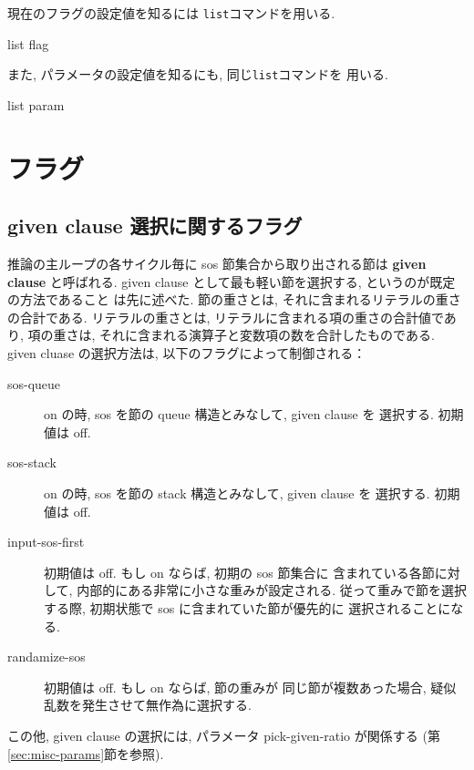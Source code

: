 現在のフラグの設定値を知るには \texttt{list}コマンドを用いる.

\begin{vvtm}
\begin{examplev}
  list flag
\end{examplev}
\end{vvtm}

また, パラメータの設定値を知るにも, 同じ\texttt{list}コマンドを
用いる.

\begin{vvtm}
\begin{examplev}
  list param
\end{examplev}
\end{vvtm}

\section{フラグ}
\label{sec:pn-flag}

\subsection{given clause 選択に関するフラグ}
\label{sec:loop-flags}
推論の主ループの各サイクル毎に sos 節集合から取り出される節は
\textbf{given clause} と呼ばれる.
given clause として最も軽い節を選択する, というのが既定の方法であること
は先に述べた. 節の重さとは, それに含まれるリテラルの重さの合計である.
リテラルの重さとは, リテラルに含まれる項の重さの合計値であり,
項の重さは, それに含まれる演算子と変数項の数を合計したものである.
given cluase の選択方法は, 以下のフラグによって制御される：
\begin{description}
\item[sos-queue] on の時, sos を節の queue 構造とみなして, given clause を 
  選択する. 初期値は off.
\item[sos-stack] on の時, sos を節の stack 構造とみなして, given clause を
  選択する. 初期値は off.
\item[input-sos-first] 初期値は off. もし on ならば, 初期の sos 節集合に
  含まれている各節に対して, 内部的にある非常に小さな重みが設定される.
  従って重みで節を選択する際, 初期状態で sos に含まれていた節が優先的に
  選択されることになる.  
\item[randamize-sos] 初期値は off. もし on ならば, 節の重みが
  同じ節が複数あった場合, 疑似乱数を発生させて無作為に選択する.
\end{description}
この他, given clause の選択には, パラメータ pick-given-ratio が関係する
(第\ref{sec:misc-params}節を参照). 

